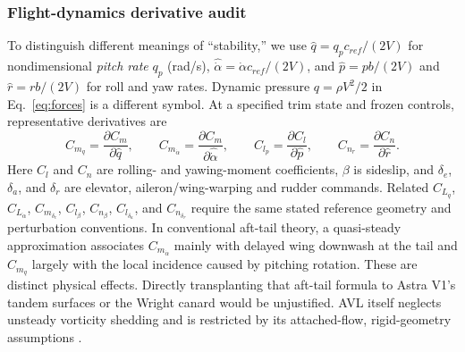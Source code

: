 \documentclass[11pt,a4paper]{article}
\begin{document}
\subsubsection{Flight-dynamics derivative audit}
To distinguish different meanings of ``stability,'' we use $\hat q=q_pc_{ref}/(2V)$ for nondimensional \emph{pitch rate} $q_p$ (rad/s), $\widehat{\dot\alpha}=\dot\alpha c_{ref}/(2V)$, and $\hat p=pb/(2V)$ and $\hat r=rb/(2V)$ for roll and yaw rates. Dynamic pressure $q=\rho V^2/2$ in Eq.~\ref{eq:forces} is a different symbol. At a specified trim state and frozen controls, representative derivatives are
\begin{equation}
C_{m_q}=\frac{\partial C_m}{\partial\hat q},\qquad
C_{m_{\dot\alpha}}=\frac{\partial C_m}{\partial\widehat{\dot\alpha}},\qquad
C_{l_p}=\frac{\partial C_l}{\partial\hat p},\qquad
C_{n_r}=\frac{\partial C_n}{\partial\hat r}.
\label{eq:rate_derivatives}
\end{equation}
Here $C_l$ and $C_n$ are rolling- and yawing-moment coefficients, $\beta$ is sideslip, and $\delta_e$, $\delta_a$, and $\delta_r$ are elevator, aileron/wing-warping and rudder commands. Related $C_{L_q}$, $C_{L_{\dot\alpha}}$, $C_{m_{\delta_e}}$, $C_{l_\beta}$, $C_{n_\beta}$, $C_{l_{\delta_a}}$, and $C_{n_{\delta_r}}$ require the same stated reference geometry and perturbation conventions. In conventional aft-tail theory, a quasi-steady approximation associates $C_{m_{\dot\alpha}}$ mainly with delayed wing downwash at the tail and $C_{m_q}$ largely with the local incidence caused by pitching rotation. These are distinct physical effects. Directly transplanting that aft-tail formula to Astra V1's tandem surfaces or the Wright canard would be unjustified. AVL itself neglects unsteady vorticity shedding and is restricted by its attached-flow, rigid-geometry assumptions \cite{ref40}.
\end{document}
